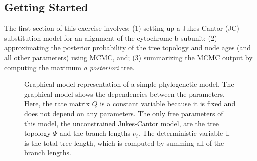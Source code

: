 \bigskip
\subsection{Getting Started}

The first section of this exercise involves:
(1) setting up a Jukes-Cantor (JC) substitution model for an alignment of the cytochrome b subunit;
(2) approximating the posterior probability of the tree topology and node ages (and all other parameters) using MCMC, and; 
(3) summarizing the MCMC output by computing the maximum \textit{a posteriori} tree. 

\begin{figure}[h!]
\centering
{}
\caption{\small Graphical model representation of a simple phylogenetic model. 
The graphical model shows the dependencies between the parameters.
Here, the rate matrix $Q$ is a constant variable because it is fixed and does not depend on any parameters.
The only free parameters of this model, the unconstrained Jukes-Cantor model, are the tree topology $\Psi$ and the branch lengths $\nu_i$. The deterministic variable $\mathbb{L}$ is the total tree length, which is computed by summing all of the branch lengths.}
\label{fig:jc}
\end{figure}

